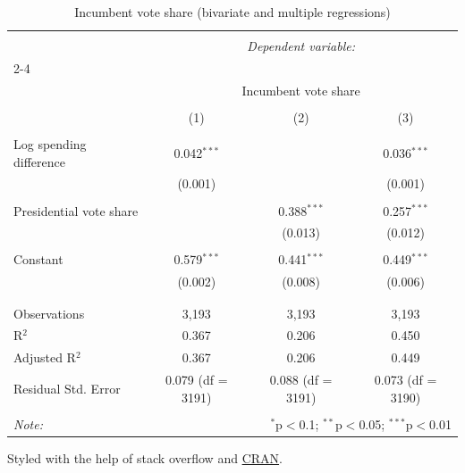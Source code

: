 \documentclass[12pt,letterpaper]{article}
\begin{document}
	\begin{table}[h] \centering 
		\caption{Incumbent vote share (bivariate and multiple regressions)} 
		\label{} 
		\small 
		\begin{tabular}{@{\extracolsep{3pt}}lccc} 
			\\[-1.8ex]\hline 
			\hline \\[-1.8ex] 
			& \multicolumn{3}{c}{\textit{Dependent variable:}} \\ 
			\cline{2-4} 
			\\[-1.8ex] & \multicolumn{3}{c}{Incumbent vote share} \\ 
			\\[-1.8ex] & (1) & (2) & (3)\\ 
			\hline \\[-1.8ex] 
			Log spending difference & 0.042$^{***}$ &  & 0.036$^{***}$ \\ 
			& (0.001) &  & (0.001) \\ 
			& & & \\ 
			Presidential vote share &  & 0.388$^{***}$ & 0.257$^{***}$ \\ 
			&  & (0.013) & (0.012) \\ 
			& & & \\ 
			Constant & 0.579$^{***}$ & 0.441$^{***}$ & 0.449$^{***}$ \\ 
			& (0.002) & (0.008) & (0.006) \\ 
			& & & \\ 
			\hline \\[-1.8ex] 
			Observations & 3,193 & 3,193 & 3,193 \\ 
			R$^{2}$ & 0.367 & 0.206 & 0.450 \\ 
			Adjusted R$^{2}$ & 0.367 & 0.206 & 0.449 \\ 
			Residual Std. Error & 0.079 (df = 3191) & 0.088 (df = 3191) & 0.073 (df = 3190) \\ 
			\hline 
			\hline \\[-1.8ex] 
			\textit{Note:}  & \multicolumn{3}{r}{$^{*}$p$<$0.1; $^{**}$p$<$0.05; $^{***}$p$<$0.01} \\ 
		\end{tabular} 
	\end{table} 
	
	\vspace{1.5cm}
	\noindent Styled with the help of stack overflow and \href{https://cran.r-project.org/web/packages/stargazer/vignettes/stargazer.pdf}{CRAN}.
	
	
	
\end{document}
